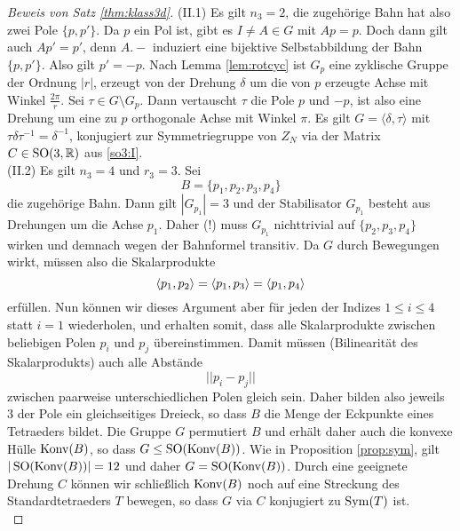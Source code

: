 \documentclass{book}
\begin{document}
\begin{proof}[Beweis von Satz \ref{thm:klass3d}]
    \noindent
    (II.1) Es gilt $n_3 = 2$, die zugehörige Bahn hat also zwei Pole
    $\{p,p'\}$. Da $p$ ein Pol ist, gibt es $I \ne A \in G$ mit $Ap = p$. Doch
    dann gilt auch $Ap' = p'$, denn $A.-$ induziert eine bijektive
    Selbstabbildung der Bahn $\{p,p'\}$. Also gilt $p' = -p$. Nach Lemma
    \ref{lem:rotcyc} ist $G_p$ eine zyklische Gruppe der Ordnung $|r|$,
    erzeugt von der Drehung $\delta$ um die von $p$ erzeugte Achse mit Winkel
    $\frac{2 \pi}{r}$. Sei $\tau \in G \setminus G_p$. Dann vertauscht $\tau$
    die Pole $p$ und $-p$, ist also eine Drehung um eine zu $p$ orthogonale
    Achse mit Winkel $\pi$. Es gilt $G = \langle \delta, \tau \rangle$ mit
    $\tau \delta \tau^{-1} = \delta^{-1}$, konjugiert zur Symmetriegruppe von
    $Z_N$ via der Matrix $C \in \operatorname{SO}(3,\mathbb{R})$ aus \ref{so3:I}.\\  

    \noindent
    (II.2) Es gilt $n_3 = 4$ und $r_3 = 3$. Sei
    \[
        B = \{p_1, p_2, p_3, p_4\}
    \]
    die zugehörige Bahn. Dann gilt $|G_{p_1}| = 3$
    und der Stabilisator $G_{p_1}$ besteht aus Drehungen um die Achse $p_1$.
    Daher (!) muss $G_{p_1}$ nichttrivial auf $\{p_2,p_3,p_4\}$ wirken und
    demnach wegen der Bahnformel transitiv. Da $G$ durch Bewegungen wirkt,
    müssen also die Skalarprodukte
    \[
        \langle p_1, p_2 \rangle = \langle p_1, p_3 \rangle = \langle p_1, p_4 \rangle
    \]
    erfüllen. Nun können wir dieses Argument aber für jeden der Indizes $1 \le i \le 4$
    statt $i = 1$ wiederholen, und erhalten somit, dass alle Skalarprodukte
    zwischen beliebigen Polen $p_i$ und $p_j$ übereinstimmen. Damit müssen
    (Bilinearität des Skalarprodukts) auch alle Abstände
    \[
        || p_i - p_j ||
    \]
    zwischen paarweise unterschiedlichen Polen gleich sein. Daher bilden also
    jeweils $3$ der Pole ein gleichseitiges Dreieck, so dass $B$ die Menge
    der Eckpunkte eines Tetraeders bildet. Die Gruppe $G$ permutiert $B$ und
    erhält daher auch die konvexe Hülle $\operatorname{Konv}(B)$, so dass $G \le
    \operatorname{SO}(\operatorname{Konv}(B))$. Wie in Proposition \ref{prop:sym}, gilt $|\operatorname{SO}(\operatorname{Konv}(B))| =
    12$ und daher $G = \operatorname{SO}(\operatorname{Konv}(B))$. Durch eine geeignete Drehung $C$ können wir
    schließlich $\operatorname{Konv}(B)$ noch auf eine Streckung des Standardtetraeders $T$ bewegen, so
    dass $G$ via $C$ konjugiert zu $\operatorname{Sym}(T)$ ist.\\ 


\end{proof}
\end{document}
